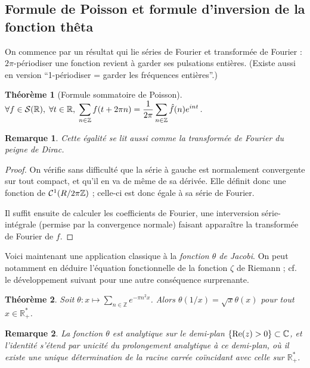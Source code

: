 \documentclass[a4paper, 11pt]{article}
\def\Z{\mathbb{Z}}
\def\R{\mathbb{R}}
\def\C{\mathbb{C}}
\def\S{{\cal{S}}}
\def\Cf{{\cal{C}}}
\def\Re{\textnormal{Re}}
\newtheorem*{theorem}{Théorème}
\newtheorem*{remark}{Remarque}
\begin{document}
\newpage

\subsection{Formule de Poisson et formule d'inversion de la fonction thêta}

On commence par un résultat qui lie séries de Fourier et transformée de Fourier :
$2\pi$-périodiser une fonction revient à garder ses pulsations entières. (Existe
aussi en version \enquote{1-périodiser = garder les fréquences entières}.)

\begin{theorem}[Formule sommatoire de Poisson]
  $\displaystyle \forall f \in \S(\R),\; \forall t \in \R,\; \sum_{n \in \Z} f(t
  + 2\pi n) = \frac{1}{2\pi} \sum_{n \in \Z} \hat{f}(n)e^{int}$.
\end{theorem}

\begin{remark}
  Cette égalité se lit aussi comme la transformée de Fourier du peigne de Dirac.
\end{remark}

\begin{proof}
  On vérifie sans difficulté que la série à gauche est normalement convergente
  sur tout compact, et qu'il en va de même de sa dérivée. Elle définit donc une
  fonction de $\Cf^1(R/2\pi\Z)$ ; celle-ci est donc égale à sa série de Fourier.

  Il suffit ensuite de calculer les coefficients de Fourier, une interversion
  série-intégrale (permise par la convergence normale) faisant apparaître la
  transformée de Fourier de $f$.
\end{proof}

Voici maintenant une application classique à la \emph{fonction $\theta$ de
  Jacobi}. On peut notamment en déduire l'équation fonctionnelle de la fonction
$\zeta$ de Riemann ; cf. le développement suivant pour une autre conséquence
surprenante.

\begin{theorem}
  Soit $\theta : x \mapsto \sum_{n \in \Z} e^{-\pi n^2 x}$.
  Alors $\theta(1/x) = \sqrt{x}\theta(x)$ pour tout $x \in \R_+^*$.
\end{theorem}
\begin{remark}
  La fonction $\theta$ est analytique sur le demi-plan $\{\Re(z) > 0\}
  \subset \C$, et l'identité s'étend par unicité du prolongement analytique à ce
  demi-plan, où il existe une unique détermination de la racine carrée
  coïncidant avec celle sur $\R^*_+$.
\end{remark}
\end{document}
